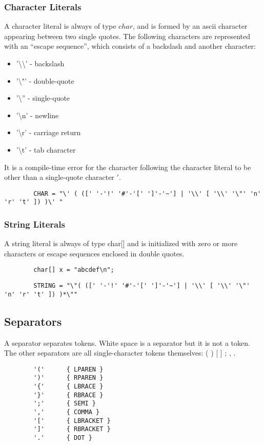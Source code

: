\begin{homeworkProblem}
	\subsubsection{Character Literals}
	A character literal is always of type $char$, and is formed by an ascii character appearing between two single quotes. The following characters are represented with an “escape sequence”, which consists of a backslash and another character:\\
	\begin{itemize}
		\item '\textbackslash\textbackslash' - backslash
		\item '\textbackslash"' - double-quote
		\item '\textbackslash'' - single-quote
		\item '\textbackslash n' - newline
		\item '\textbackslash r' - carriage return
		\item '\textbackslash t' - tab character
	\end{itemize}
	It is a compile-time error for the character following the character literal to be other than a single-quote character $'$.
	
	\begin{verbatim}
		CHAR = "\' ( ([' '-'!' '#'-'[' ']'-'~'] | '\\' [ '\\' '\"' 'n' 'r' 't' ]) )\' "
	\end{verbatim}
	
	
	\subsubsection{String Literals}
	A string literal is always of type char[] and is initialized with zero or more characters or escape sequences enclosed in double quotes.
	\begin{verbatim}
		char[] x = "abcdef\n";
	\end{verbatim}
	
	\begin{verbatim}
		STRING = "\"( ([' '-'!' '#'-'[' ']'-'~'] | '\\' [ '\\' '\"' 'n' 'r' 't' ]) )*\""
	\end{verbatim}
	
	\subsection{Separators}
	A separator separates tokens. White space is a separator but it is not a token. The other separators are all single-character tokens themselves:
	( ) [ ] { } ; , .
	\begin{verbatim}
		'('      { LPAREN }
		')'      { RPAREN }
		'{'      { LBRACE }
		'}'      { RBRACE }
		';'      { SEMI }
		','      { COMMA }
		'['      { LBRACKET }
		']'      { RBRACKET }
		'.'      { DOT }
	\end{verbatim}
	

\end{homeworkProblem}
